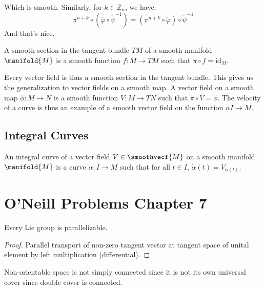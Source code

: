         Which is smooth. Similarly, for $k\in\mathbb{Z}_{n}$, we have:
        \begin{equation}
            \pi^{n+k}\circ(\tilde{\varphi}\circ\tilde{\psi}^{\minus{1}})
            =(\pi^{n+k}\circ\tilde{\varphi})\circ\tilde{\psi}^{\minus{1}}
        \end{equation}
        And that's nice.
        \begin{definition}
            A smooth section in the tangent bundle $TM$ of a smooth manifold
            $\manifold{M}$ is a smooth function $f:M\rightarrow{TM}$ such
            that $\pi\circ{f}=\textrm{id}_{M}$.
        \end{definition}
        Every vector field is thus a smooth section in the tangent bundle.
        This gives us the generalization to vector fields on a smooth map.
        A vector field on a smooth map $\phi:M\rightarrow{N}$ is a smooth
        function $V:M\rightarrow{TN}$ such that $\pi\circ{V}=\phi$. The
        velocity of a curve is thus an example of a smooth vector field on
        the function $\alpha{I}\rightarrow{M}$.
    \subsection{Integral Curves}
        \begin{definition}
            An integral curve of a vector field $V\in\smoothvecf{M}$ on a
            smooth manifold $\manifold{M}$ is a curve
            $\alpha:I\rightarrow{M}$ such that for all $t\in{I}$,
            $\dot{\alpha}(t)=V_{\alpha(t)}$.
        \end{definition}
\section{O'Neill Problems Chapter 7}
            \begin{theorem}
                Every Lie group is parallelizable.
            \end{theorem}
            \begin{proof}
                Parallel transport of non-zero tangent vector at tangent space
                of unital element by left multiplication (differential).
            \end{proof}
            Non-orientable space is not simply connected since it is not its own
            universal cover since double cover is connected.
